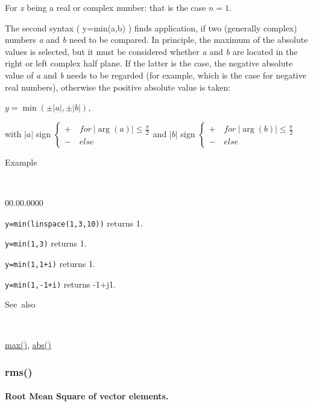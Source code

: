 For \textit{x} being a real or complex number: that is the
case $n=1$.

The second syntax ( y=min(a,b) ) finds application, if two (generally
complex) numbers \textit{a} and \textit{b} need to be compared. In
principle, the maximum of the absolute values is selected, but it
must be considered whether \textit{a} and \textit{b} are located in
the right or left complex half plane. If the latter is the case, the
negative absolute value of \textit{a} and \textit{b} needs to be regarded
(for example, which is the case for negative real numbers), otherwise
the positive absolute value is taken:

\medskip{}
$y=\min\left(\pm\left|a\right|,\pm\left|b\right|\right)$,

with $\left|a\right|$ sign $\left\{ \begin{array}{l}
+\quad for\:\left|\arg\left(a\right)\right|\leq\frac{\pi}{2}\\
-\quad else\end{array}\right.$and $\left|b\right|$ sign $\left\{ \begin{array}{l}
+\quad for\:\left|\arg\left(b\right)\right|\leq\frac{\pi}{2}\\
-\quad else\end{array}\right.$
\medskip{}

\begin{description}
\item [Example]~
\end{description}
\begin{lyxlist}{00.00.0000}
\item [\texttt{y=min(linspace(1,3,10))}]returns 1.
\item [\texttt{y=min(1,3)}]returns 1.
\item [\texttt{y=min(1,1+i)}]returns 1.
\item [\texttt{y=min(1,-1+i)}]returns -1+j1.
\end{lyxlist}
\begin{description}
\item [See~also]~
\end{description}
\textcolor{blue}{\hyperlink{max}{max()}}\textcolor{black}{,} \textcolor{blue}{\hyperlink{abs}{abs()}}


\newpage
\subsubsection*{\hypertarget{rms}{}{\Large rms()}}


\paragraph{\label{par:rms}Root Mean Square of vector elements.}

